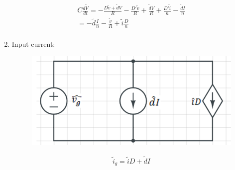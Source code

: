 \documentclass{article}
\begin{document}
\begin{enumerate}
    \begin{gather*}
        C\frac{d\tilde V}{dt}=-\frac{D\tilde v+\tilde d V}{R}-\frac{D'\tilde v}{R}+\frac{\tilde d V}{R}+\frac{D'\tilde i}{n}-\frac{\tilde d I}{n}\\
        =-\tilde d \frac{I}{n}-\frac{\tilde v}{R} +\tilde i \frac{D}{n}\\
    \end{gather*}
    
    \newpage
    \item Input current:
    \begin{figure}[H]
        \centering
        \includegraphics[scale=0.75]{x3.png}
        \label{fig:my_label}
    \end{figure}
    
    \begin{gather*}
       \tilde i_g =\tilde iD+\tilde d I\\
    \end{gather*}
    
   
\end{enumerate}
 
\end{document}
